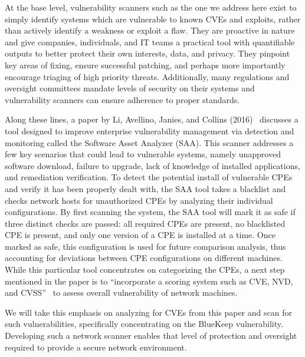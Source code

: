At the base level, vulnerability scanners such as the one we address here exist to simply identify systems which are vulnerable to known CVEs and exploits, rather than actively identify a weakness or exploit a flaw. They are proactive in nature and give companies, individuals, and IT teams a practical tool with quantifiable outputs to better protect their own interests, data, and privacy. They pinpoint key areas of fixing, ensure successful patching, and perhaps more importantly encourage triaging of high priority threats. Additionally, many regulations and oversight committees mandate levels of security on their systems and vulnerability scanners can ensure adherence to proper standards.

Along these lines, a paper by Li, Avellino, Janies, and Collins (2016)~\cite{li_avellino_janies_collins_2016} discusses a tool designed to improve enterprise vulnerability management via detection and monitoring called the Software Asset Analyzer (SAA). This scanner addresses a few key scenarios that could lead to vulnerable systems, namely unapproved software download, failure to upgrade, lack of knowledge of installed applications, and remediation verification. To detect the potential install of vulnerable CPEs and verify it has been properly dealt with, the SAA tool takes a blacklist and checks network hosts for unauthorized CPEs by analyzing their individual configurations. By first scanning the system, the SAA tool will mark it as safe if three distinct checks are passed: all required CPEs are present, no blacklisted CPE is present, and only one version of a CPE is installed at a time. Once marked as safe, this configuration is used for future comparison analysis, thus accounting for deviations between CPE configurations on different machines. While this particular tool concentrates on categorizing the CPEs, a next step mentioned in the paper is to ``incorporate a scoring system such as CVE, NVD, and CVSS''~\cite{li_avellino_janies_collins_2016} to assess overall vulnerability of network machines. 

We will take this emphasis on analyzing for CVEs from this paper and scan for such vulnerabilities, specifically concentrating on the BlueKeep vulnerability. Developing such a network scanner enables that level of protection and oversight required to provide a secure network environment.